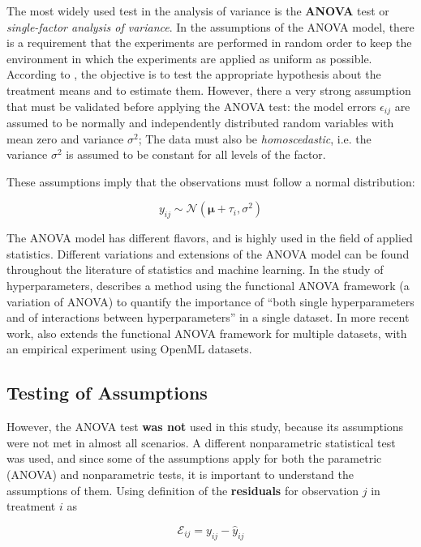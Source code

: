 The most widely used test in the analysis of variance is the \textbf{ANOVA} test or \textit{single-factor analysis of variance}. In the assumptions of the ANOVA model, there is a requirement that the experiments are performed in random order to keep the environment in which the experiments are applied as uniform as possible. According to \cite{montgomery2017design}, the objective is to test the appropriate hypothesis about the treatment means and to estimate them. However, there a very strong assumption that must be validated before applying the ANOVA test: the model errors $\epsilon_{ij}$ are assumed to be normally and independently distributed random variables with mean zero and variance $\sigma^2$; The data must also be \textit{homoscedastic}, i.e. the variance $\sigma^2$ is assumed to be constant for all levels of the factor.

These assumptions imply that the observations must follow a normal distribution:

$$y_{ij} \sim \mathcal{N}(\bm{\mu} + \tau_i, \sigma^2)$$

The ANOVA model has different flavors, and is highly used in the field of applied statistics. Different variations and extensions of the ANOVA model can be found throughout the literature of statistics and machine learning. In the study of hyperparameters, \cite{hoos201x4efficient} describes a method using the functional ANOVA framework (a variation of ANOVA) to quantify the importance of ``both single hyperparameters and of interactions between hyperparameters'' in a single dataset. In more recent work, \cite{van2017empirical} also extends the functional ANOVA framework for multiple datasets, with an empirical experiment using OpenML datasets.

\subsection{Testing of Assumptions}

However, the ANOVA test \textbf{was not} used in this study, because its assumptions were not met in almost all scenarios. A different nonparametric statistical test was used, and since some of the assumptions apply for both the parametric (ANOVA) and nonparametric tests, it is important to understand the assumptions of them. Using \cite{montgomery2017design} definition of the \textbf{residuals} for observation $j$ in treatment $i$ as

\begin{equation}
    \mathcal{E}_{ij} = y_{ij} - \hat{y}_{ij}    
    \label{eq:sfm-residuals}
\end{equation}


